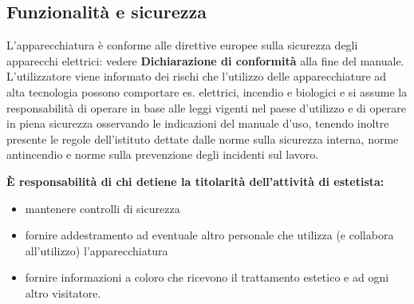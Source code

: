 \documentclass[a4paper]{article}
\begin{document}
\subsection{Funzionalità e sicurezza}
L'apparecchiatura è conforme alle direttive europee sulla sicurezza degli apparecchi elettrici: vedere \textbf{Dichiarazione di conformità} alla fine del manuale.\\
L'utilizzatore viene informato dei rischi che l'utilizzo delle apparecchiature ad alta tecnologia possono comportare es. elettrici, incendio e biologici e si assume la responsabilità di operare in base alle leggi vigenti nel paese d'utilizzo e di operare in piena sicurezza osservando le indicazioni del manuale d'uso, tenendo inoltre presente le regole dell'istituto dettate dalle norme sulla sicurezza interna, norme antincendio e norme sulla prevenzione degli incidenti sul lavoro.

\vspace{10pt}
\noindent \textbf{È responsabilità di chi detiene la titolarità dell'attività di estetista:}
\begin{itemize}
  \item mantenere controlli di sicurezza
  \item fornire addestramento ad eventuale altro personale che utilizza (e collabora all'utilizzo) l'apparecchiatura
  \item fornire informazioni a coloro che ricevono il trattamento estetico e ad ogni altro visitatore.
\end{itemize}
\end{document}
